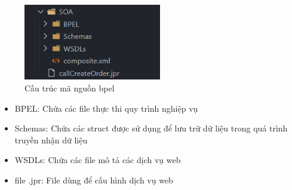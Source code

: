 \begin{figure}[!htp]
    \begin{center}
        \includegraphics[width=6cm]{img/file-structure/bpel.png}
    \end{center}
    \caption{Cấu trúc mã nguồn bpel}
\end{figure}

\begin{itemize}
    \item BPEL: Chứa các file thực thi quy trình nghiệp vụ
    \item Schemas: Chứa các struct được sử dụng để lưu trữ dữ liệu trong quá trình truyền nhận dữ liệu
    \item WSDLs: Chứa các file mô tả các dịch vụ web
    \item file .jpr: File dùng để cấu hình dịch vụ web
\end{itemize}